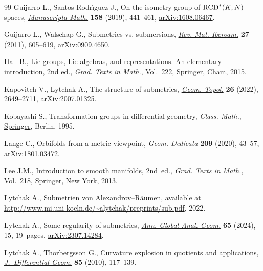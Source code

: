 \begin{thebibliography}{99}
Guijarro L., Santos-Rodr\'{\i}guez J., On the isometry group of {${\rm
 RCD}^*(K,N)$}-spaces,
 \href{https://doi.org/10.1007/s00229-018-1010-7}{\textit{Manuscripta Math.}}
 \textbf{158} (2019), 441--461,
 \href{http://arxiv.org/abs/1608.06467}{arXiv:1608.06467}.

Guijarro L., Walschap G., Submetries vs. submersions,
 \href{https://doi.org/10.4171/RMI/648}{\textit{Rev. Mat. Iberoam.}}
 \textbf{27} (2011), 605--619,
 \href{http://arxiv.org/abs/0909.4650}{arXiv:0909.4650}.

Hall B., Lie groups, {L}ie algebras, and representations. An elementary
 introduction, 2nd ed., \textit{Grad. Texts in Math.}, Vol.~222,
 \href{https://doi.org/10.1007/978-3-319-13467-3}{Springer}, Cham, 2015.

Kapovitch V., Lytchak A., The structure of submetries,
 \href{https://doi.org/10.2140/gt.2022.26.2649}{\textit{Geom. Topol.}}
 \textbf{26} (2022), 2649--2711,
 \href{http://arxiv.org/abs/2007.01325}{arXiv:2007.01325}.

Kobayashi S., Transformation groups in differential geometry, \textit{Class. Math.},
 \href{https://doi.org/10.1007/978-3-642-61981-6}{Springer}, Berlin, 1995.

Lange C., Orbifolds from a metric viewpoint,
 \href{https://doi.org/10.1007/s10711-020-00521-x}{\textit{Geom. Dedicata}}
 \textbf{209} (2020), 43--57,
 \href{http://arxiv.org/abs/1801.03472}{arXiv:1801.03472}.

Lee J.M., Introduction to smooth manifolds, 2nd~ed., \textit{Grad. Texts in Math.}, Vol.~218, \href{https://doi.org/10.1007/978-1-4419-9982-5}{Springer}, New
 York, 2013.

Lytchak A., Submetrien von {A}lexandrov--{R}\"aumen, available at
 \url{http://www.mi.uni-koeln.de/~alytchak/preprints/sub.pdf}, 2022.

Lytchak A., Some regularity of submetries,
 \href{https://doi.org/10.1007/s10455-024-09946-z}{\textit{Ann. Global Anal.
 Geom.}} \textbf{65} (2024), 15, 19~pages,
 \href{http://arxiv.org/abs/2307.14284}{arXiv:2307.14284}.

Lytchak A., Thorbergsson G., Curvature explosion in quotients and applications,
 \href{https://doi.org/10.4310/jdg/1284557927}{\textit{J.~Differential Geom.}}
 \textbf{85} (2010), 117--139.


\end{thebibliography}
